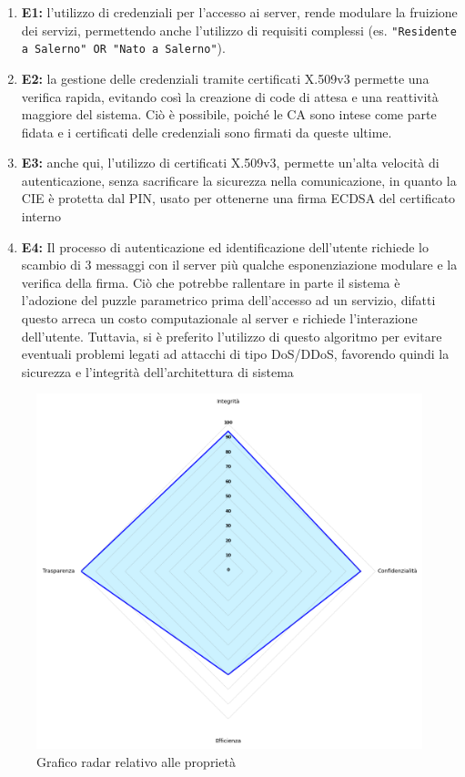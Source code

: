         \begin{enumerate}
            \item \textbf{E1:} l'utilizzo di credenziali per l'accesso ai server, rende modulare la fruizione dei servizi, permettendo anche l'utilizzo di requisiti complessi (es. \verb|"Residente a Salerno" OR "Nato a Salerno"|).

            \item \textbf{E2:} la gestione delle credenziali tramite certificati X.509v3 permette una verifica rapida, evitando così la creazione di code di attesa e una reattività maggiore del sistema.
            Ciò è possibile, poiché le CA sono intese come parte fidata e i certificati delle credenziali sono firmati da queste ultime.

            \item \textbf{E3:} anche qui, l'utilizzo di certificati X.509v3, permette un'alta velocità di autenticazione, senza sacrificare la sicurezza nella comunicazione, in quanto la CIE è protetta dal PIN, usato per ottenerne una firma ECDSA del certificato interno 

            \item \textbf{E4:} Il processo di autenticazione ed identificazione dell'utente richiede lo scambio di 3 messaggi con il server più qualche esponenziazione modulare e la verifica della firma.
            Ciò che potrebbe rallentare in parte il sistema è l'adozione del puzzle parametrico prima dell'accesso ad un servizio, difatti questo arreca un costo computazionale al server e richiede l'interazione dell'utente.
            Tuttavia, si è preferito l'utilizzo di questo algoritmo per evitare eventuali problemi legati ad attacchi di tipo DoS/DDoS, favorendo quindi la sicurezza e l'integrità dell'architettura di sistema
        \end{enumerate}

    
    \begin{figure}[H]
        \centering
        \includegraphics[width=1 \textwidth]{radar.png}
        \caption{Grafico radar relativo alle proprietà}
        \label{radar-graph-properties}
    \end{figure}